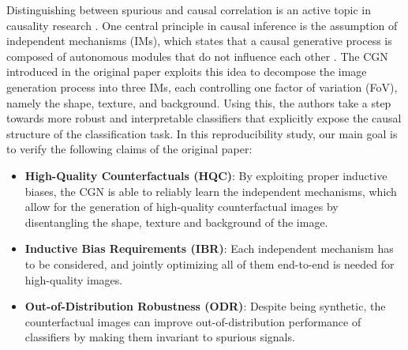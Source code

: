 Distinguishing between spurious and causal correlation is an active topic in causality research \cite{kaushik2019learning, olson2021counterfactual}. One central principle in causal inference is the assumption of independent mechanisms (IMs), which states that a causal generative process is composed of autonomous modules that do not influence each other \cite{pearl2009causality, Sauer2021ICLR, scholkopf2019causality}. The CGN introduced in the original paper exploits this idea to decompose the image generation process into three IMs, each controlling one factor of variation (FoV), namely the shape, texture, and background. Using this, the authors take a step towards more robust and interpretable classifiers that explicitly expose the causal structure of the classification task. In this reproducibility study, our main goal is to verify the following claims of the original paper:
\begin{itemize}
    \item \textbf{High-Quality Counterfactuals (HQC)}: By exploiting proper inductive biases, the CGN is able to reliably learn the independent mechanisms, which allow for the generation of high-quality counterfactual images by disentangling the shape, texture and background of the image.
    \item \textbf{Inductive Bias Requirements (IBR)}: Each independent mechanism has to be considered, and jointly optimizing all of them end-to-end is needed for high-quality images.
    \item \textbf{Out-of-Distribution Robustness (ODR)}: Despite being synthetic, the counterfactual images can improve out-of-distribution performance of classifiers by making them invariant to spurious signals.
\end{itemize}

